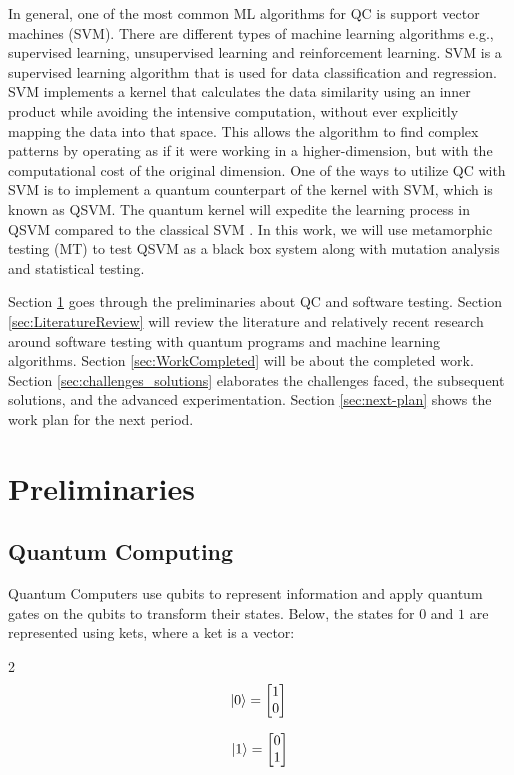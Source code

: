 \documentclass[12pt,a4paper]{article}
\DeclarePairedDelimiter\ket{\lvert}{\rangle}
\begin{document}
	In general, one of the most common ML algorithms for QC is support vector machines (SVM). There are different types of machine learning algorithms e.g., supervised learning, unsupervised learning and reinforcement learning. SVM is a supervised learning algorithm that is used for data classification and regression. SVM implements a kernel that calculates the data similarity using an inner product while avoiding the intensive computation, without ever explicitly mapping the data into that space. This allows the algorithm to find complex patterns by operating as if it were working in a higher-dimension, but with the computational cost of the original dimension. One of the ways to utilize QC with SVM is to implement a quantum counterpart of the kernel with SVM, which is known as QSVM. The quantum kernel will expedite the learning process in QSVM compared to the classical SVM \cite{Rebentrost_2014} \cite{Gentinetta_2024}. In this work, we will use metamorphic testing (MT) to test QSVM as a black box system along with mutation analysis and statistical testing. 
	
	Section \ref{sec:preliminaries} goes through the preliminaries about QC and software testing.  Section \ref{sec:LiteratureReview} will review the literature and relatively recent research around software testing with quantum programs and machine learning algorithms. Section \ref{sec:WorkCompleted} will be about the completed work. Section \ref{sec:challenges_solutions} elaborates the challenges faced, the subsequent solutions, and the advanced experimentation. Section \ref{sec:next-plan} shows the work plan for the next period.
	
	
	\section {Preliminaries}
	\label{sec:preliminaries}
	
	\subsection{Quantum Computing}
	
	Quantum Computers use qubits to represent information and apply quantum gates  on the qubits to transform their states. Below, the states for $0$ and $1$ are represented using kets, where a ket is a vector:
	
	\begin{multicols}{2}
		\begin{equation*}
			\ket{0} = \begin{bmatrix}
				1 \\ 0
			\end{bmatrix}\\
		\end{equation*}
		
		\begin{equation*}
			\ket{1} = \begin{bmatrix}
				0 \\ 1
			\end{bmatrix}
		\end{equation*}
	\end{multicols}
	
\end{document}
